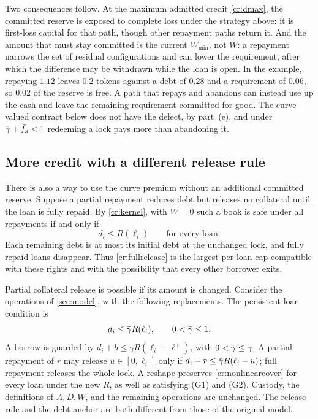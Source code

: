 Two consequences follow. At the maximum admitted credit \eqref{cr:dmax}, the committed reserve is exposed to complete loss under the strategy above: it is first-loss capital for that path, though other repayment paths return it. And the amount that must stay committed is the current $W_{\min}$, not $W$: a repayment narrows the set of residual configurations and can lower the requirement, after which the difference may be withdrawn while the loan is open. In the example, repaying $1.12$ leaves $0.2$ tokens against a debt of $0.28$ and a requirement of $0.06$, so $0.02$ of the reserve is free. A path that repays and abandons can instead use up the cash and leave the remaining requirement committed for good. The curve-valued contract below does not have the defect, by part~(e), and under $\bar\gamma+\bar f_s<1$ redeeming a lock pays more than abandoning it.

\subsection{More credit with a different release rule}\label{cr:nonlinear}\label{sec:credit-release}

There is also a way to use the curve premium without an additional committed reserve. Suppose a partial repayment reduces debt but releases no collateral until the loan is fully repaid. By \cref{cr:kernel}, with $W=0$ such a book is safe under all repayments if and only if
\begin{equation}\label{cr:fullrelease}
d_i\le R(\ell_i)\qquad\text{for every loan}.
\end{equation}
Each remaining debt is at most its initial debt at the unchanged lock, and fully repaid loans disappear. Thus \eqref{cr:fullrelease} is the largest per-loan cap compatible with these rights and with the possibility that every other borrower exits.

Partial collateral release is possible if its amount is changed. Consider the operations of \cref{sec:model}, with the following replacements. The persistent loan condition is
\begin{equation}\label{cr:nonlinearcover}
d_i\le\bar\gamma R(\ell_i),\qquad 0<\bar\gamma\le1.
\end{equation}
A borrow is guarded by $d_i+b\le\gamma R(\ell_i+\ell^+)$, with $0<\gamma\le\bar\gamma$. A partial repayment of $r$ may release $u\in[0,\ell_i]$ only if $d_i-r\le\bar\gamma R(\ell_i-u)$; full repayment releases the whole lock. A reshape preserves \eqref{cr:nonlinearcover} for every loan under the new $R$, as well as satisfying (G1) and (G2). Custody, the definitions of $A,D,W$, and the remaining operations are unchanged. The release rule and the debt anchor are both different from those of the original model.

